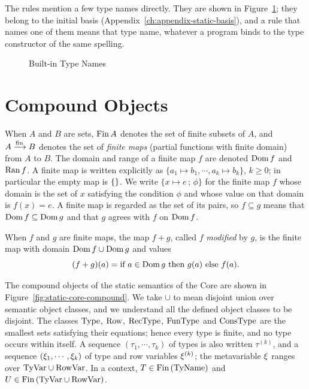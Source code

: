 The rules mention a few type names directly. They are shown in
Figure~\ref{fig:static-core-builtin}; they belong to the initial basis
(Appendix~\ref{ch:appendix-static-basis}), and a rule that names one of them
means that type name, whatever a program binds to the type constructor of the
same spelling.

\begin{figure}[ht]
\centering
\begin{objtable}
\end{objtable}
\caption{Built-in Type Names}\label{fig:static-core-builtin}
\end{figure}

\section{Compound Objects}\label{sec:static-core-compound}

When $A$ and $B$ are sets, $\mathrm{Fin}\, A$ denotes the set of finite subsets of $A$,
and $A \xrightarrow{\mathrm{fin}} B$ denotes the set of \emph{finite maps} (partial functions with
finite domain) from $A$ to $B$. The domain and range of a finite map $f$ are
denoted $\mathrm{Dom}\, f$ and $\mathrm{Ran}\, f$. A finite map is written explicitly as
$\{a_1 \mapsto b_1, \cdots, a_k \mapsto b_k\}$, $k \ge 0$; in particular the
empty map is $\{\}$. We write $\{x \mapsto e \,;\, \phi\}$ for the finite
map $f$ whose domain is the set of $x$ satisfying the condition $\phi$ and whose
value on that domain is $f(x) = e$. A finite map is regarded as the set of its
pairs, so $f \subseteq g$ means that $\mathrm{Dom}\, f \subseteq \mathrm{Dom}\, g$ and that $g$
agrees with $f$ on $\mathrm{Dom}\, f$.

When $f$ and $g$ are finite maps, the map $f + g$, called $f$
\emph{modified} by $g$, is the finite map with domain $\mathrm{Dom}\, f \cup \mathrm{Dom}\, g$ and
values
\[
  (f + g)(a) = \text{if } a \in \mathrm{Dom}\, g \text{ then } g(a) \text{ else } f(a).
\]

The compound objects of the static semantics of the Core are shown in
Figure~\ref{fig:static-core-compound}. We take $\cup$ to mean disjoint union
over semantic object classes, and we understand all the defined object classes
to be disjoint. The classes $\mathrm{Type}$, $\mathrm{Row}$, $\mathrm{RecType}$, $\mathrm{FunType}$ and
$\mathrm{ConsType}$ are the smallest sets satisfying their equations; hence every type
is finite, and no type occurs within itself. %
A sequence $(\tau_1, \cdots, \tau_k)$ of types is also written $\tau^{(k)}$, and
a sequence $(\xi_1, \cdots, \xi_k)$ of type and row variables
$\xi^{(k)}$; the metavariable $\xi$ ranges over $\mathrm{TyVar} \cup
\mathrm{RowVar}$. In a context, $T \in \mathrm{Fin}\,(\mathrm{TyName})$ and $U \in \mathrm{Fin}\,(\mathrm{TyVar} \cup
\mathrm{RowVar})$.

